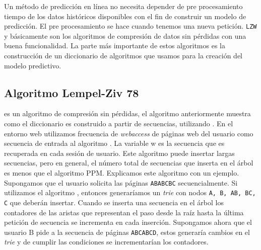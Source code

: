 Un método de predicción en línea no necesita depender de pre procesamiento tiempo de los datos históricos disponibles con el fin de construir un modelo de predicción. El pre procesamiento se hace cuando tenemos una nueva petición. \texttt{LZW} y \lzSieteOcho básicamente son los algoritmos de compresión de datos sin pérdidas con una buena funcionalidad. La parte más importante de estos algoritmos es la construcción de un diccionario de algoritmos que usamos para la creación del modelo predictivo. 






















\uncm
\subsection{Algoritmo Lempel-Ziv 78}







\lzSieteOcho es un algoritmo de compresión sin pérdidas, el algoritmo anteriormente muestra  como el diccionario es construido  a partir de secuencias, utilizando \lzSieteOcho. En el entorno web utilizamos frecuencia de \emph{webaccess} de páginas web del usuario como secuencia de entrada al algoritmo \lzSieteOcho. La variable w es la secuencia que es recuperada en cada sesión de usuario. Este algoritmo puede insertar largas secuencias, pero en general, el número total de secuencias que inserta en el árbol es menos que el algoritmo PPM. Explicamos este algoritmo con un ejemplo. Supongamos que el usuario solicita las páginas \texttt{ABABCBC} secuencialmente. Si utilizamos el algoritmo \lzSieteOcho, entonces generaríamos un \emph{trie} con nodos  \texttt{A, B, AB, BC, C} que deberán insertar. 
Cuando se inserta una secuencia en el árbol los contadores de las aristas que representan el paso desde la raíz hasta la última petición de secuencia se incrementa en cada inserción. Supongamos ahora que el usuario B pide a la secuencia de páginas \texttt{ABCABCD}, estos generaría cambios en el \emph{trie} y de cumplir las condiciones se incrementarían los contadores. 

